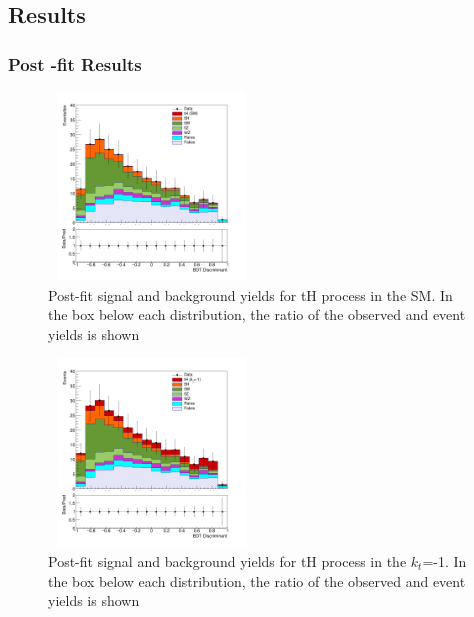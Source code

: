 \documentclass[11pt]{beamer}
\begin{document}
\begin{frame}
\subsection{Results}
\frametitle{Post -fit Results}
\begin{minipage}{0.4\textwidth}
	\begin{center}
	\begin{figure}
		\includegraphics[width=5.5cm,height=5cm]{figures/simple.png}
		\caption*{\tiny{Post-fit signal and background yields for tH process in the SM. In the
			box below each distribution, the ratio of the observed and  event yields is shown}}
	\end{figure}
\end{center}
\end{minipage}\hfill \quad
\begin{minipage}{0.4\textwidth}
	\begin{center}
	\begin{figure}
		\includegraphics[width=5.5cm,height=5cm]{figures/simple-kt-1.png}
		\caption*{\tiny{Post-fit signal and background yields for tH process in the $k_t$=-1. 
	In the box below each distribution, the ratio of the observed and event yields is shown}}
	\end{figure}
\end{center}
\end{minipage}
\end{frame}
\end{document}
